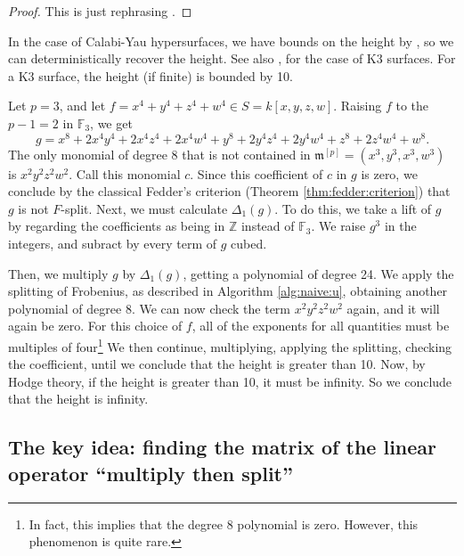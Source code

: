 \begin{proof}
	This is just rephrasing \cite[Theorem~C]{kty-2022-fedder}.
\end{proof}

In the case of Calabi-Yau hypersurfaces, we have bounds on the height by
\cite{van-der-geer-katsura-2003-calabi-yau},
so we can deterministically recover the height.  
See also \cite[Theorem~0.1]{artin-1974-k3-surfaces},
for the case of K3 surfaces.
For a K3 surface, the height (if finite) is bounded by 10.

\begin{ex}
    Let \(p=3\), and let
    \(f = x^4 + y^4 + z^4 + w^4 \in S = k[x,y,z,w]\).
    Raising \(f\) to the \(p-1 = 2\) in \(\mathbb{F}_{3}\), we get
    \[
    g = x^8 + 2x^4y^4 + 2x^4z^4 + 2x^4w^4 + y^8 + 2y^4z^4 + 2y^4w^4 + z^8 + 2z^4w^4 + w^8
    .\] 
    The only monomial of degree \(8\) that is not contained
    in \(\mathfrak{m}^{[p]} = (x^{3}, y^{3}, x^{3}, w^{3})\) is \(x^{2}y^{2}z^{2}w^{2}\).
    Call this monomial \(c\).
    Since this coefficient of \(c\) in \(g\) is zero, we conclude
    by the classical Fedder's criterion (Theorem \ref{thm:fedder:criterion})
    that \(g\) is not \(F\)-split.
    Next, we must calculate \(\Delta_{1}(g)\).
    To do this, we take a lift of \(g\) by regarding the coefficients
    as being in \(\mathbb{Z}\) instead of \(\mathbb{F}_{3}\).
    We raise \(g^3\) in the integers, and subract by every term of \(g\) 
    cubed.

    Then, we multiply \(g\) by \(\Delta_{1}(g)\), getting a polynomial of degree 24.
    We apply the splitting of Frobenius, as described in Algorithm \ref{alg:naive:u}, 
    obtaining another polynomial of degree \(8\). 
    We can now check the term \(x^2y^2z^2w^2\) again, and it will again be zero. 
    For this choice of $f$, all of the exponents for all quantities 
    must be multiples of four\footnote{
    In fact, this implies that the degree \(8\) polynomial is zero.
    However, this phenomenon is quite rare.
    }
    We then continue, multiplying, applying the splitting, checking the coefficient, 
    until we conclude that the height is greater than 10. 
    Now, by Hodge theory, if the height is greater than 10, it must be infinity. 
    So we conclude that the height is infinity.
\end{ex}

\subsection{The key idea: finding the matrix of the linear operator ``multiply then split''}

